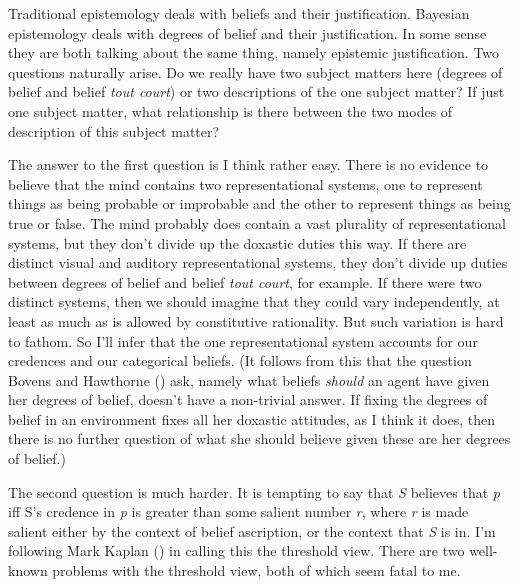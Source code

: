 \documentclass[
  11pt,
  letterpaper,
  DIV=11,
  numbers=noendperiod,
  twoside]{scrartcl}
\begin{document}
Traditional epistemology deals with beliefs and their justification.
Bayesian epistemology deals with degrees of belief and their
justification. In some sense they are both talking about the same thing,
namely epistemic justification. Two questions naturally arise. Do we
really have two subject matters here (degrees of belief and belief
\emph{tout court}) or two descriptions of the one subject matter? If
just one subject matter, what relationship is there between the two
modes of description of this subject matter?

The answer to the first question is I think rather easy. There is no
evidence to believe that the mind contains two representational systems,
one to represent things as being probable or improbable and the other to
represent things as being true or false. The mind probably does contain
a vast plurality of representational systems, but they don't divide up
the doxastic duties this way. If there are distinct visual and auditory
representational systems, they don't divide up duties between degrees of
belief and belief \emph{tout court}, for example. If there were two
distinct systems, then we should imagine that they could vary
independently, at least as much as is allowed by constitutive
rationality. But such variation is hard to fathom. So I'll infer that
the one representational system accounts for our credences and our
categorical beliefs. (It follows from this that the question Bovens and
Hawthorne () ask, namely what beliefs
\emph{should} an agent have given her degrees of belief, doesn't have a
non-trivial answer. If fixing the degrees of belief in an environment
fixes all her doxastic attitudes, as I think it does, then there is no
further question of what she should believe given these are her degrees
of belief.)

The second question is much harder. It is tempting to say that \emph{S}
believes that \emph{p} iff S's credence in \emph{p} is greater than some
salient number \emph{r}, where \emph{r} is made salient either by the
context of belief ascription, or the context that \emph{S} is in. I'm
following Mark Kaplan () in calling this
the threshold view. There are two well-known problems with the threshold
view, both of which seem fatal to me.
\end{document}
